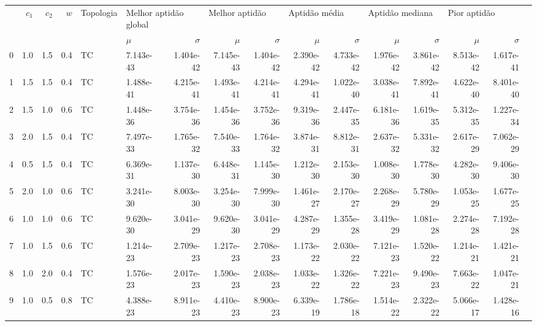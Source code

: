 \begin{tabular}{lrrrllrrrrrrrrrr}
\toprule
{} &  $c_1$ &  $c_2$ &    $w$ &                Topologia  & \multicolumn{2}{l}{Melhor aptidão global} & \multicolumn{2}{l}{Melhor aptidão} & \multicolumn{2}{l}{Aptidão média} & \multicolumn{2}{l}{Aptidão mediana} & \multicolumn{2}{l}{Pior aptidão} \\
{} & &  & & &                $\mu$ &           $\sigma$ &          $\mu$ &           $\sigma$ &          $\mu$ &           $\sigma$ &           $\mu$ &           $\sigma$ &          $\mu$ &           $\sigma$ \\
\midrule
0  &  1.0 &  1.5 &  0.4 &  TC  &        7.143e-43 &  1.404e-42 &  7.145e-43 &  1.404e-42 &  2.390e-42 &  4.733e-42 &   1.976e-42 &  3.861e-42 &  8.513e-42 &  1.617e-41 \\
1  &  1.5 &  1.5 &  0.4 &  TC  &        1.488e-41 &  4.215e-41 &  1.493e-41 &  4.214e-41 &  4.294e-41 &  1.022e-40 &   3.038e-41 &  7.892e-41 &  4.622e-40 &  8.401e-40 \\
2  &  1.5 &  1.0 &  0.6 &  TC  &        1.448e-36 &  3.754e-36 &  1.454e-36 &  3.752e-36 &  9.319e-36 &  2.447e-35 &   6.181e-36 &  1.619e-35 &  5.312e-35 &  1.227e-34 \\
3  &  2.0 &  1.5 &  0.4 &  TC  &        7.497e-33 &  1.765e-32 &  7.540e-33 &  1.764e-32 &  3.874e-31 &  8.812e-31 &   2.637e-32 &  5.331e-32 &  2.617e-29 &  7.062e-29 \\
4  &  0.5 &  1.5 &  0.4 &  TC  &        6.369e-31 &  1.137e-30 &  6.448e-31 &  1.145e-30 &  1.212e-30 &  2.153e-30 &   1.008e-30 &  1.778e-30 &  4.282e-30 &  9.406e-30 \\
5  &  2.0 &  1.0 &  0.6 &  TC  &        3.241e-30 &  8.003e-30 &  3.254e-30 &  7.999e-30 &  1.461e-27 &  2.170e-27 &   2.268e-29 &  5.780e-29 &  1.053e-25 &  1.677e-25 \\
6  &  1.0 &  1.0 &  0.6 &  TC  &        9.620e-30 &  3.041e-29 &  9.620e-30 &  3.041e-29 &  4.287e-29 &  1.355e-28 &   3.419e-29 &  1.081e-28 &  2.274e-28 &  7.192e-28 \\
7  &  1.0 &  1.5 &  0.6 &  TC  &        1.214e-23 &  2.709e-23 &  1.217e-23 &  2.708e-23 &  1.173e-22 &  2.030e-22 &   7.121e-23 &  1.520e-22 &  1.214e-21 &  1.421e-21 \\
8  &  1.0 &  2.0 &  0.4 &  TC  &        1.576e-23 &  2.017e-23 &  1.590e-23 &  2.038e-23 &  1.033e-22 &  1.326e-22 &   7.221e-23 &  9.490e-23 &  7.663e-22 &  1.047e-21 \\
9  &  1.0 &  0.5 &  0.8 &  TC  &        4.388e-23 &  8.911e-23 &  4.410e-23 &  8.900e-23 &  6.339e-19 &  1.786e-18 &   1.514e-22 &  2.322e-22 &  5.066e-17 &  1.428e-16 \\

\end{tabular}
